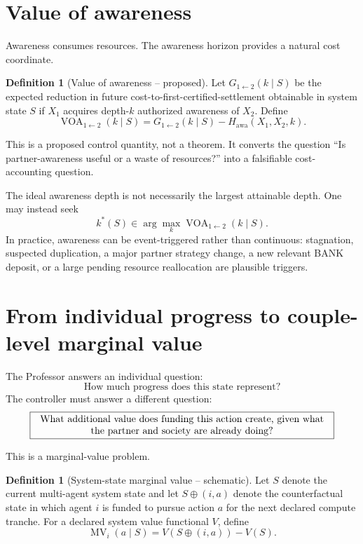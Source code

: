 \documentclass[11pt]{article}
\theoremstyle{definition}
\newtheorem{definition}[theorem]{Definition}
\theoremstyle{remark}
\newcommand{\VOA}{\operatorname{VOA}}
\newcommand{\marg}{\operatorname{MV}}
\begin{document}
\section{Value of awareness}

Awareness consumes resources. The awareness horizon provides a natural cost coordinate.

\begin{definition}[Value of awareness -- proposed]
Let $G_{1\leftarrow2}(k\mid S)$ be the expected reduction in future cost-to-first-certified-settlement obtainable in system state $S$ if $X_1$ acquires depth-$k$ authorized awareness of $X_2$. Define
\[
\boxed{
\VOA_{1\leftarrow2}(k\mid S)
=
G_{1\leftarrow2}(k\mid S)
-
H_{\mathrm{awa}}(X_1,X_2,k).
}
\]
\end{definition}

This is a proposed control quantity, not a theorem. It converts the question ``Is partner-awareness useful or a waste of resources?'' into a falsifiable cost-accounting question.

The ideal awareness depth is not necessarily the largest attainable depth. One may instead seek
\[
\boxed{
k^*(S)\in\arg\max_k\VOA_{1\leftarrow2}(k\mid S).}
\]
In practice, awareness can be event-triggered rather than continuous: stagnation, suspected duplication, a major partner strategy change, a new relevant BANK deposit, or a large pending resource reallocation are plausible triggers.

\section{From individual progress to couple-level marginal value}

The Professor answers an individual question:
\[
\text{How much progress does this state represent?}
\]
The controller must answer a different question:
\[
\boxed{\begin{minipage}{0.88\linewidth}\centering What additional value does funding this action create, given what the partner and society are already doing?\end{minipage}}
\]

This is a marginal-value problem.

\begin{definition}[System-state marginal value -- schematic]
Let $S$ denote the current multi-agent system state and let $S\oplus(i,a)$ denote the counterfactual state in which agent $i$ is funded to pursue action $a$ for the next declared compute tranche. For a declared system value functional $V$, define
\[
\boxed{
\marg_i(a\mid S)
=V(S\oplus(i,a))-V(S).
}
\]
\end{definition}
\end{document}
